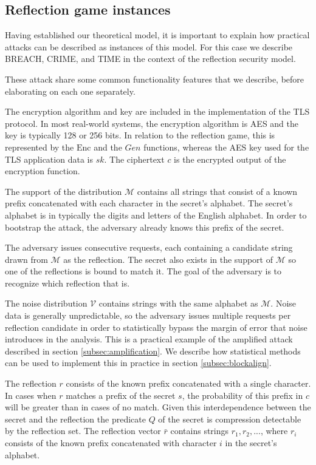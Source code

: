 \documentclass[conference, letterpaper, 10pt]{IEEEtran}
\begin{document}
\subsection{Reflection game instances}
Having established our theoretical model, it is important to explain how
practical attacks can be described as instances of this model. For this case we
describe BREACH, CRIME, and TIME in the context of the reflection security model.

These attack share some common functionality features that we describe, before
elaborating on each one separately.

The encryption algorithm and key are included in the implementation of the TLS
protocol. In most real-world systems, the encryption algorithm is AES and the
key is typically 128 or 256 bits. In relation to the reflection game, this is
represented by the $\textrm{Enc}$ and the $Gen$ functions, whereas the AES
key used for the TLS application data is $sk$. The ciphertext $c$ is the
encrypted output of the encryption function.

The support of the distribution $\mathcal{M}$ contains all strings that consist
of a known prefix concatenated with each character in the secret's alphabet. The
secret's alphabet is in typically the digits and letters of the English alphabet.
In order to bootstrap the attack, the adversary already knows this prefix of the
secret.

The adversary issues consecutive requests, each containing a candidate string
drawn from $\mathcal{M}$ as the reflection. The secret also exists in the
support of $\mathcal{M}$ so one of the reflections is bound to match it. The
goal of the adversary is to recognize which reflection that is.

The noise distribution $\mathcal{V}$ contains strings with the same alphabet as
$\mathcal{M}$. Noise data is generally unpredictable, so the adversary issues
multiple requests per reflection candidate in order to statistically bypass the
margin of error that noise introduces in the analysis. This is a practical
example of the amplified attack described in section \ref{subsec:amplification}.
We describe how statistical methods can be used to implement this in practice in
section \ref{subsec:blockalign}.

The reflection $r$ consists of the known prefix concatenated with a single
character. In cases when $r$ matches a prefix of the secret $s$, the probability
of this prefix in $c$ will be greater than in cases of no match.
Given this interdependence between the secret and the reflection the predicate
$Q$ of the secret is compression detectable by the reflection set. The
reflection vector $\bar{r}$ contains strings $r_1, r_2, ...$, where $r_i$
consists of the known prefix concatenated with character $i$ in the secret's
alphabet.
\end{document}
